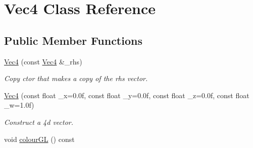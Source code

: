 \hypertarget{classVec4}{
\section{Vec4 Class Reference}
\label{classVec4}
}
\subsection*{Public Member Functions}
\begin{DoxyCompactItemize}
\item 
\hyperlink{classVec4_a208636976b38fb5b7a964cf87c28901f}{Vec4} (const \hyperlink{classVec4}{Vec4} \&\_\-rhs)
\begin{DoxyCompactList}\small\item\em Copy ctor that makes a copy of the rhs vector. \item\end{DoxyCompactList}\item 
\hyperlink{classVec4_a72a49d139b8312f1eac661223fbdf08a}{Vec4} (const float \_\-x=0.0f, const float \_\-y=0.0f, const float \_\-z=0.0f, const float \_\-w=1.0f)
\begin{DoxyCompactList}\small\item\em Construct a 4d vector. \item\end{DoxyCompactList}\item 
\hypertarget{classVec4_ab6408ead37201958bbf4a9680b8d65a9}{
void \hyperlink{classVec4_ab6408ead37201958bbf4a9680b8d65a9}{colourGL} () const }
\label{classVec4_ab6408ead37201958bbf4a9680b8d65a9}


\end{DoxyCompactItemize}
